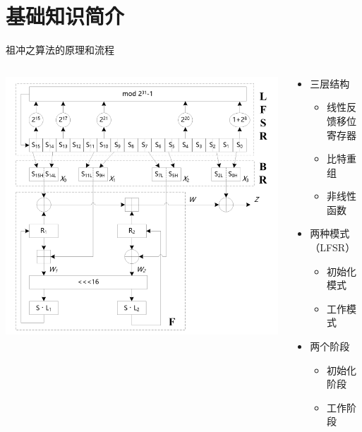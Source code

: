 \documentclass{beamer}
\begin{document}
\section{基础知识简介}   %

\begin{frame}{祖冲之算法的原理和流程}
\begin{columns}
    \begin{column}{0.5\textwidth}
        \includegraphics[width=\columnwidth]{./images/zuc-flow.png}
    \end{column}
    \begin{column}{0.5\textwidth}
        \begin{itemize}
            \item 三层结构
            \begin{itemize}
                \item 线性反馈移位寄存器
                \item 比特重组
                \item 非线性函数
            \end{itemize}
            \item 两种模式（LFSR）
            \begin{itemize}
                \item 初始化模式
                \item 工作模式
            \end{itemize}
            \item 两个阶段
            \begin{itemize}
                \item 初始化阶段
                \item 工作阶段
            \end{itemize}
        \end{itemize}
    \end{column}
\end{columns}
\end{frame}
\end{document}
